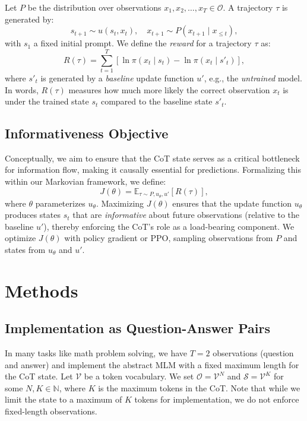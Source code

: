 \documentclass{article}
\begin{document}
Let $P$ be the distribution over observations $x_1, x_2, \dots, x_T \in \mathcal{O}$. A trajectory $\tau$ is generated by:
\[
s_{t+1}\sim u(s_t, x_t), \quad x_{t+1}\sim P(x_{t+1}\mid x_{\le t}),
\]
with $s_1$ a fixed initial prompt. We define the \emph{reward} for a trajectory $\tau$ as:
\[
R(\tau)=\sum_{t=1}^T \left[\ln \pi(x_t\mid s_t)-\ln \pi(x_t\mid s'_t)\right],
\]
where $s'_t$ is generated by a \emph{baseline} update function $u'$, e.g., the \emph{untrained} model. In words, $R(\tau)$ measures how much more likely the correct observation $x_t$ is under the trained state $s_t$ compared to the baseline state $s'_t$.

\subsection{Informativeness Objective}

Conceptually, we aim to ensure that the CoT state serves as a critical bottleneck for information flow, making it causally essential for predictions. Formalizing this within our Markovian framework, we define:
\[
  J(\theta)=\mathbb{E}_{\tau \sim P,u_\theta,u'}\left[R(\tau)\right],
\]
where $\theta$ parameterizes $u_\theta$. Maximizing $J(\theta)$ ensures that the update function $u_\theta$ produces states $s_t$ that are \emph{informative} about future observations (relative to the baseline $u'$), thereby enforcing the CoT's role as a load-bearing component. We optimize $J(\theta)$ with policy gradient or PPO, sampling observations from $P$ and states from $u_\theta$ and $u'$.

\section{Methods}
\label{sec:method}

\subsection{Implementation as Question-Answer Pairs}
In many tasks like math problem solving, we have $T=2$ observations (question and answer) and implement the abstract MLM with a fixed maximum length for the CoT state. Let $\mathcal{V}$ be a token vocabulary. We set $\mathcal{O} = \mathcal{V}^N$ and $\mathcal{S} = \mathcal{V}^K$ for some $N, K \in \mathbb{N}$, where $K$ is the maximum tokens in the CoT. Note that while we limit the state to a maximum of $K$ tokens for implementation, we do not enforce fixed-length observations. 
\end{document}
